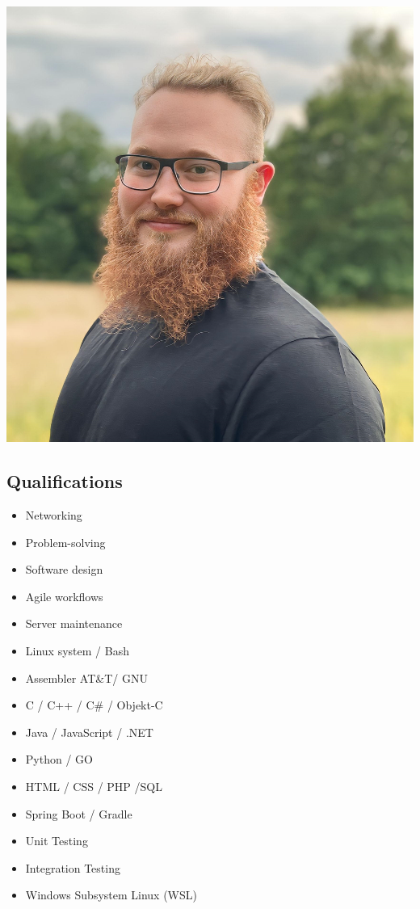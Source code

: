 \documentclass{article}
\begin{document}
	\begin{minipage}[t]{0.28\textwidth}
		\begin{minipage}[t]{0.8\textwidth}
			\vspace{-140pt} %
			\includegraphics[width=\linewidth]{../../me.png}
			\label{fig:bild}
		\end{minipage}
		\vspace{-10pt} %
		\subsection*{\textcolor{colorBlue}{Qualifications}}
		\begin{itemize}
			\item Networking
			\item Problem-solving
			\item Software design
			\item Agile workflows
			\item Server maintenance
			\item Linux system / Bash
			\item Assembler AT\&T/ GNU
			\item C / C++ / C\# / Objekt-C
			\item Java / JavaScript / .NET
			\item Python / GO
			\item HTML / CSS / PHP /SQL
			\item Spring Boot / Gradle
			\item Unit Testing
			\item Integration Testing
			\item Windows Subsystem Linux (WSL)
		\end{itemize}
		\vspace{-10pt} %

\end{minipage}
\end{document}
